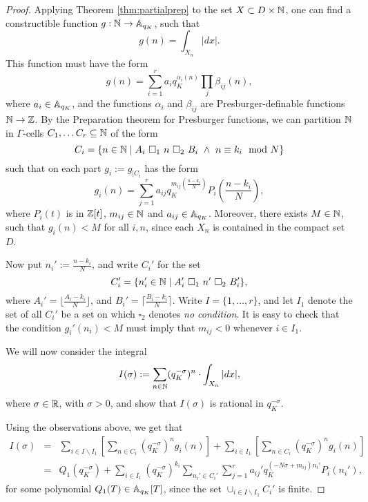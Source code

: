 \begin{proof}


Applying Theorem \ref{thm:partialprep} to the set $X \subset D\times \NN$, one can find a constructible function $g: \NN \to \AA_{q_K}$, such that
\[g(n) = \int_{X_n}|dx|.\]
This function must have the form 
\[g(n) = \sum_{i=1}^r a_iq_K^{\alpha_i(n)}\prod_j\beta_{ij}(n),\]
where $a_i \in \AA_{q_K}$, and the functions $\alpha_i$ and $\beta_{ij}$ are Presburger-definable functions $\NN \to \ZZ$. By the Preparation theorem for Presburger functions, we can partition $\N$ in $\Gamma$-cells $C_1, \ldots C_r \subseteq \N$ of the form
\[C_i = \{ n \in \N \mid A_i \ \square_1 \ n \ \square_2\ B_i \ \wedge\ n \equiv k_i \mod N \}\]
 such that on each part $g_i:= g_{|C_i}$ has the form 
\[g_i(n) = \sum_{j=1}^r a_{ij}q_K^{m_{ij}(\frac{n-k_i}{N})}P_i\left(\frac{n-k_i}{N}\right),\]
where $P_i(t)$ is in $\Z[t]$, $m_{ij} \in \N$ and $a_{ij} \in \AA_{q_K}$. Moreover, there exists $M \in \N$, such that $g_i(n) <M$ for all $i,n$, since each $X_n$ is contained in the compact set $D$.
 
Now put $n_i' := \frac{n-k_i}{N}$, and write $C_i'$ for the set
\[C_i'=\{n_i'\in \N \mid A_i'\ \square_1 \ n' \ \square_2 \ B_i'\},\]
where $A_i' =\lfloor \frac{A_i-k_i}{N}\rfloor$, and $B_i' =\lceil \frac{B_i-k_i}{N}\rceil$. Write $I = \{1, \ldots, r\}$, and let $I_1$ denote the set of all $C_i'$ be a set on which $\square_2$ denotes \emph{no condition}. It is easy to check that the condition $g_i'(n_i) <M$ must imply that $m_{ij}<0$ whenever $i \in I_1$.  

We will now consider the integral
\[I(\sigma):=\sum_{n\in\NN}(q_K^{-\sigma})^{n}\cdot \int_{X_n}|dx|,\] 
where $\sigma \in \RR$, with $\sigma>0$, and show that $I(\sigma)$ is rational in $q_K^{-\sigma}$.

Using the observations above, we get that
\begin{eqnarray*}
I(\sigma) %
&=& \sum_{i\in I\backslash I_1}\left[ \sum_{n \in C_i} (q_K^{-\sigma})^{n}g_i(n)\right] + \sum_{i\in I_1}\left[ \sum_{n \in C_i} (q_K^{-\sigma})^{n}g_i(n)\right]\\
&=&Q_1(q_K^{-\sigma}) +\sum_{i \in I_1 }(q_K^{-\sigma})^{k_i} \sum_{n_i' \in C_i'}\sum_{j=1}^r a_{ij}'q_K^{(-N\sigma +m_{ij})n_i'}P_i(n_i'),
\end{eqnarray*}
for some polynomial $Q_1(T) \in \AA_{q_K}[T]$, since the set $\cup_{i\in I\backslash I_1} C_i'$ is finite.


\end{proof}
